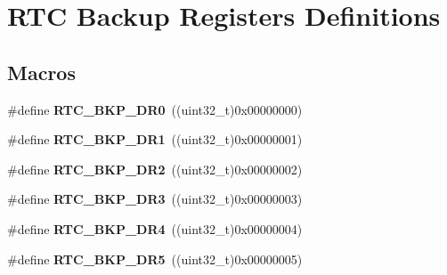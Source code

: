 \hypertarget{group___r_t_c_ex___backup___registers___definitions}{}\section{R\+TC Backup Registers Definitions}
\label{group___r_t_c_ex___backup___registers___definitions}
\subsection*{Macros}
\begin{DoxyCompactItemize}
\item 
\#define {\bfseries R\+T\+C\+\_\+\+B\+K\+P\+\_\+\+D\+R0}~((uint32\+\_\+t)0x00000000)\hypertarget{group___r_t_c_ex___backup___registers___definitions_ga519bec4c7714e123cf2664f7394dc1ab}{}\label{group___r_t_c_ex___backup___registers___definitions_ga519bec4c7714e123cf2664f7394dc1ab}

\item 
\#define {\bfseries R\+T\+C\+\_\+\+B\+K\+P\+\_\+\+D\+R1}~((uint32\+\_\+t)0x00000001)\hypertarget{group___r_t_c_ex___backup___registers___definitions_ga6988b61b031e1407787095b0ff214ea8}{}\label{group___r_t_c_ex___backup___registers___definitions_ga6988b61b031e1407787095b0ff214ea8}

\item 
\#define {\bfseries R\+T\+C\+\_\+\+B\+K\+P\+\_\+\+D\+R2}~((uint32\+\_\+t)0x00000002)\hypertarget{group___r_t_c_ex___backup___registers___definitions_ga09963fdfb90ed5b7e32db13671447abb}{}\label{group___r_t_c_ex___backup___registers___definitions_ga09963fdfb90ed5b7e32db13671447abb}

\item 
\#define {\bfseries R\+T\+C\+\_\+\+B\+K\+P\+\_\+\+D\+R3}~((uint32\+\_\+t)0x00000003)\hypertarget{group___r_t_c_ex___backup___registers___definitions_ga014a39228ba4783b62ac8f11929ecd6a}{}\label{group___r_t_c_ex___backup___registers___definitions_ga014a39228ba4783b62ac8f11929ecd6a}

\item 
\#define {\bfseries R\+T\+C\+\_\+\+B\+K\+P\+\_\+\+D\+R4}~((uint32\+\_\+t)0x00000004)\hypertarget{group___r_t_c_ex___backup___registers___definitions_ga97545ebe0827a8650f953c371368f3f5}{}\label{group___r_t_c_ex___backup___registers___definitions_ga97545ebe0827a8650f953c371368f3f5}

\item 
\#define {\bfseries R\+T\+C\+\_\+\+B\+K\+P\+\_\+\+D\+R5}~((uint32\+\_\+t)0x00000005)\hypertarget{group___r_t_c_ex___backup___registers___definitions_gacab50ce68839698c48b8e2e143656ae7}{}\label{group___r_t_c_ex___backup___registers___definitions_gacab50ce68839698c48b8e2e143656ae7}


\end{DoxyCompactItemize}
